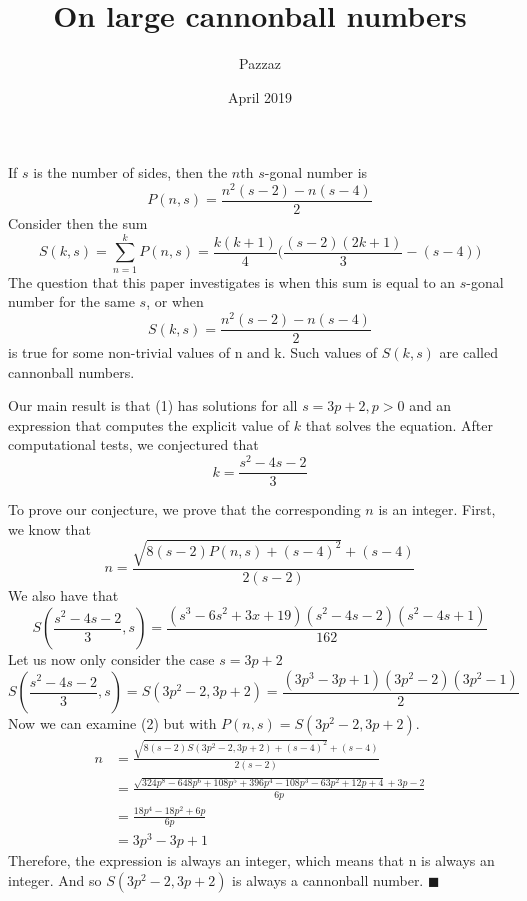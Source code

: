 \documentclass{article}
\title{On large cannonball numbers}
\author{Pazzaz}
\date{April 2019}
\begin{document}
\maketitle

If $s$ is the number of sides, then the $n$th $s$-gonal number is
$$
P(n, s) = \frac{n^2(s-2)-n(s-4)}{2}
$$
Consider then the sum
$$
S(k, s) = \sum_{n=1}^{k} P(n, s)=\frac{k(k+1)}{4}\Bigg(\frac{(s-2)(2k+1)}{3}-(s-4)\Bigg)
$$
The question that this paper investigates is when this sum is equal to an $s$-gonal number for the same $s$, or when
\begin{equation}
S(k, s) = \frac{n^2(s-2)-n(s-4)}{2}
\end{equation}
is true for some non-trivial values of n and k. Such values of $S(k, s)$ are called cannonball numbers.

Our main result is that (1) has solutions for all $s=3p+2, p>0$ and an expression that computes the explicit value of $k$ that solves the equation.
After computational tests, we conjectured that
$$
k= \frac{s^2-4s-2}{3}
$$

To prove our conjecture, we prove that the corresponding $n$ is an integer. First, we know that
\begin{equation}
n= \frac{\sqrt{8(s-2)P(n, s)+(s-4)^2}+(s-4)}{2(s-2)}
\end{equation}
We also have that
$$
S(\frac{s^2-4s-2}{3}, s)=\frac{(s^3-6s^2+3x+19)(s^2-4s-2)(s^2-4s+1)}{162}
$$
Let us now only consider the case $s=3p+2$
$$
S(\frac{s^2-4s-2}{3}, s)=S(3p^2-2, 3p+2)=\frac{\left(3p^3-3p+1\right)\left(3p^2-2\right)\left(3p^2-1\right)}{2}
$$
Now we can examine (2) but with $P(n, s)=S(3p^2-2, 3p+2)$.
\begin{equation*}
\begin{split}
n &= \frac{\sqrt{8(s-2)S(3p^2-2, 3p+2)+(s-4)^2}+(s-4)}{2(s-2)}\\&= \frac{\sqrt{324p^8-648p^6+108p^5+396p^4-108p^3-63p^2+12p+4}+3p-2}{6p} \\
&=\frac{18p^4-18p^2+6p}{6p}\\
&=3p^3-3p+1
\end{split}
\end{equation*}
Therefore, the expression is always an integer, which means that n is always an integer. And so $S(3p^2-2, 3p+2)$ is always a cannonball number. $\blacksquare$
\end{document}
